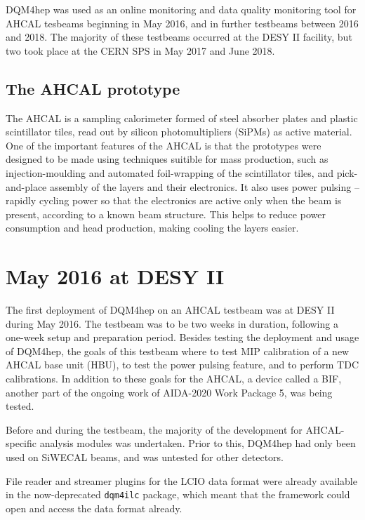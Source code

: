 DQM4hep was used as an online monitoring and data quality monitoring tool for \acrshort{AHCAL} tesbeams beginning in May 2016, and in further testbeams between 2016 and 2018. The majority of these testbeams occurred at the DESY II facility, but two took place at the CERN SPS in May 2017 and June 2018.

\subsection*{The AHCAL prototype} %
The \acrfull{AHCAL} is a sampling calorimeter formed of steel absorber plates and plastic scintillator tiles, read out by silicon photomultipliers (\acrshort{SiPM}s) as active material\cite{proceedings-ahcal-prototype}. One of the important features of the \acrshort{AHCAL} is that the prototypes were designed to be made using techniques suitible for mass production, such as injection-moulding and automated foil-wrapping of the scintillator tiles, and pick-and-place assembly of the layers and their electronics. It also uses power pulsing -- rapidly cycling power so that the electronics are active only when the beam is present, according to a known beam structure. This helps to reduce power consumption and head production, making cooling the layers easier.

\section{May 2016 at DESY II} %
The first deployment of DQM4hep on an AHCAL testbeam was at DESY II during May 2016. The testbeam was to be two weeks in duration, following a one-week setup and preparation period. Besides testing the deployment and usage of DQM4hep, the goals of this testbeam where to test \acrshort{MIP} calibration of a new AHCAL base unit (HBU), to test the power pulsing feature, and to perform \acrshort{TDC} calibrations. In addition to these goals for the AHCAL, a device called a \acrfull{BIF}, another part of the ongoing work of AIDA-2020 Work Package 5, was being tested. 

Before and during the testbeam, the majority of the development for AHCAL-specific analysis modules was undertaken. Prior to this, DQM4hep had only been used on SiWECAL beams, and was untested for other detectors. 

File reader and streamer plugins for the LCIO data format were already available in the now-deprecated \texttt{dqm4ilc} package, which meant that the framework could open and access the data format already.

